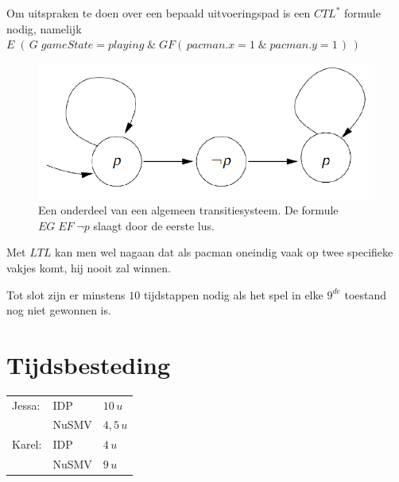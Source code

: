 \documentclass[a4paper,12pt]{article}
\begin{document}
Om uitspraken te doen over een bepaald uitvoeringspad is een $ CTL^{*} $ formule nodig, namelijk
\newline
$ E \; (\,G\;gameState = playing\; \&\; GF (\,pacman.x = 1\;\&\; pacman.y = 1\,)\,) $

\begin{figure}[h!]
\begin{center}
\includegraphics[width=0.6\columnwidth]{loops.png}
\end{center}
\caption{Een onderdeel van een algemeen transitiesysteem. 
De formule $ EG\;EF\; \neg p $ slaagt door de eerste lus.}%
\label{fig:loops}%
\end{figure}

Met $ LTL $ kan men wel nagaan dat als pacman oneindig vaak op twee specifieke vakjes komt,
hij nooit zal winnen.

Tot slot zijn er minstens $ 10 $ tijdstappen nodig als het spel in elke $ 9^{de} $ toestand nog niet gewonnen is.

\section{Tijdsbesteding}
\begin{tabular}{l l l}
Jessa: 	& IDP 	& $ 10\,u $\\
		& NuSMV 	& $ 4,5\,u $\\
Karel: 	& IDP 	& $ 4\,u $\\
		& NuSMV 	& $ 9\,u $\\
\end{tabular}

\end{document}

